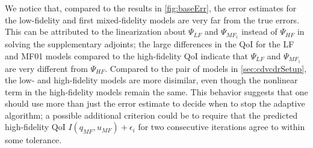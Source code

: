 We notice that, compared to the results in \cref{fig:baseErr}, the error estimates for the low-fidelity and first mixed-fidelity models are very far from the true errors. This can be attributed to the linearization about $\Psi_{LF}$ and $\Psi_{MF_{1}}$ instead of $\Psi_{HF}$ in solving the supplementary adjoints; the large differences in the QoI for the LF and MF01 models compared to the high-fidelity QoI indicate that $\Psi_{LF}$ and $\Psi_{MF_{1}}$ are very different from $\Psi_{HF}$. Compared to the pair of models in \cref{sec:cdvcdrSetup}, the low- and high-fidelity models are more disimilar, even though the nonlinear term in the high-fidelity models remain the same. This behavior suggests that one should use more than just the error estimate to decide when to stop the adaptive algorithm; a possible additional criterion could be to require that the predicted high-fidelity QoI $I(q_{MF},u_{MF})+\epsilon_i$ for two consecutive iterations agree to within some tolerance.

